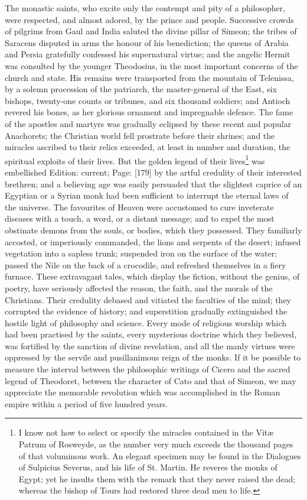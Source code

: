 The monastic saints, who excite only the contempt and pity of a philosopher, were respected, and almost adored, by the prince and people. Successive crowds of pilgrims from Gaul and India saluted the divine pillar of Simeon; the tribes of Saracens disputed in arms the honour of his benediction; the queens of Arabia and Persia gratefully confessed his supernatural virtue; and the angelic Hermit was consulted by the younger Theodosius, in the most important concerns of the church and state. His remains were transported from the mountain of Telenissa, by a solemn procession of the patriarch, the master-general of the East, six bishops, twenty-one counts or tribunes, and six thousand soldiers; and Antioch revered his bones, as her glorious ornament and impregnable defence. The fame of the apostles and martyrs was gradually eclipsed by these recent and popular Anachorets; the Christian world fell prostrate before their shrines; and the miracles ascribed to their relics exceeded, at least in number and duration, the spiritual exploits of their lives. But the golden legend of their lives\footnote{I know not how to select or specify the miracles contained in the Vitæ Patrum of Rosweyde, as the number very much exceeds the thousand pages of that voluminous work. An elegant specimen may be found in the Dialogues of Sulpicius Severus, and his life of St. Martin. He reveres the monks of Egypt; yet he insults them with the remark that they never raised the dead; whereas the bishop of Tours had restored three dead men to life.} was embellished Edition: current; Page: [179] by the artful credulity of their interested brethren; and a believing age was easily persuaded that the slightest caprice of an Egyptian or a Syrian monk had been sufficient to interrupt the eternal laws of the universe. The favourites of Heaven were accustomed to cure inveterate diseases with a touch, a word, or a distant message; and to expel the most obstinate demons from the souls, or bodies, which they possessed. They familiarly accosted, or imperiously commanded, the lions and serpents of the desert; infused vegetation into a sapless trunk; suspended iron on the surface of the water; passed the Nile on the back of a crocodile, and refreshed themselves in a fiery furnace. These extravagant tales, which display the fiction, without the genius, of poetry, have seriously affected the reason, the faith, and the morals of the Christians. Their credulity debased and vitiated the faculties of the mind; they corrupted the evidence of history; and superstition gradually extinguished the hostile light of philosophy and science. Every mode of religious worship which had been practised by the saints, every mysterious doctrine which they believed, was fortified by the sanction of divine revelation, and all the manly virtues were oppressed by the servile and pusillanimous reign of the monks. If it be possible to measure the interval between the philosophic writings of Cicero and the sacred legend of Theodoret, between the character of Cato and that of Simeon, we may appreciate the memorable revolution which was accomplished in the Roman empire within a period of five hundred years.

